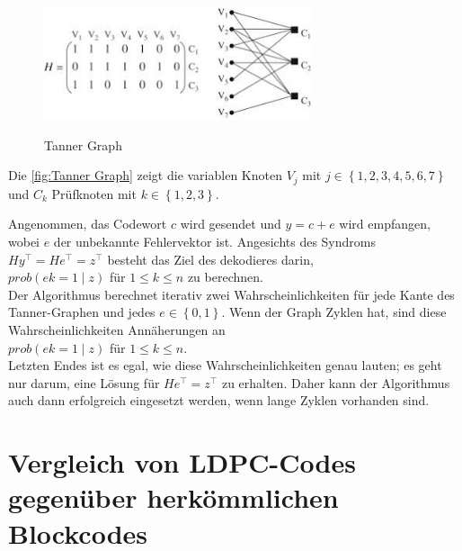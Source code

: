 \begin{figure}[!ht]
    \centering
     {\includegraphics[width=0.7\textwidth]{./pic/Tanner Graph}}
    \caption{ Tanner Graph}
    \label{fig:Tanner Graph}
\end{figure}\cite{Tannerg} 

Die \autoref{fig:Tanner Graph} zeigt die variablen Knoten $V_j$  mit $j\in \left\{1, 2, 3, 4, 5, 6, 7\right\}$ und $C_k$ Prüfknoten mit $k\in \left\{1, 2, 3\right\}$.\\

\begin{Beispiel}
Angenommen, das Codewort $c$ wird gesendet und $y = c + e$ wird empfangen, wobei $e$ der unbekannte Fehlervektor ist. Angesichts des Syndroms $Hy^\intercal = He^\intercal = z^\intercal$ besteht das Ziel des dekodieres darin,\\ 

$prob(ek = 1 \mid z)$ für $1 \leq k \leq n$ zu berechnen.\\

Der Algorithmus berechnet iterativ zwei Wahrscheinlichkeiten für jede Kante des Tanner-Graphen und jedes $e\in \left\{0, 1\right\}$. 
Wenn der Graph Zyklen hat, sind diese Wahrscheinlichkeiten Annäherungen an\\

$prob(ek = 1 \mid z)$ für $1 \leq k \leq n$.\\

Letzten Endes ist es egal, wie diese Wahrscheinlichkeiten genau lauten; es geht nur darum, eine Lösung für $He^\intercal = z^\intercal$ zu erhalten.
Daher kann der Algorithmus auch dann erfolgreich eingesetzt werden, wenn lange Zyklen vorhanden sind.\cite[S. 11]{huffman}\\
\end{Beispiel}

\section{Vergleich von LDPC-Codes gegenüber herkömmlichen Blockcodes} 

